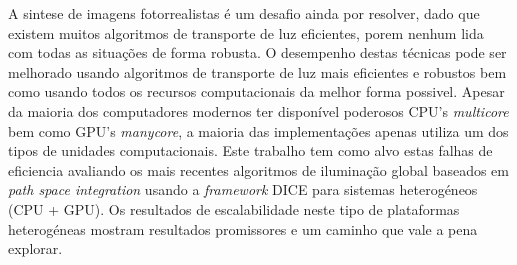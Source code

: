 A sintese de imagens fotorrealistas é um desafio ainda por resolver, dado que existem muitos algoritmos de transporte de luz eficientes, porem nenhum lida com todas as situações de forma robusta. O desempenho destas técnicas pode ser melhorado usando algoritmos de transporte de luz mais eficientes e robustos bem como usando todos os recursos computacionais da melhor forma possivel. Apesar da maioria dos computadores modernos ter disponível poderosos CPU's \textit{multicore} bem como GPU's \textit{manycore}, a maioria das implementações apenas utiliza um dos tipos de unidades computacionais. Este trabalho tem como alvo estas falhas de eficiencia avaliando os mais recentes algoritmos de iluminação global baseados em \textit{path space integration} usando a \textit{framework} DICE para sistemas heterogéneos (CPU + GPU). Os resultados de escalabilidade neste tipo de plataformas heterogéneas mostram resultados promissores e um caminho que vale a pena explorar.
